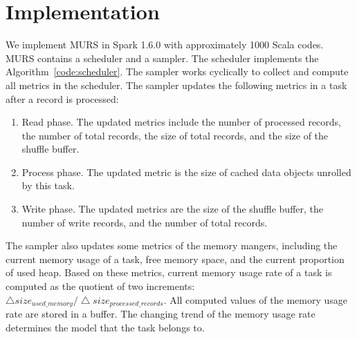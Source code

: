 \section{Implementation}

We implement MURS in Spark 1.6.0 with approximately 1000 Scala codes. MURS contains a scheduler and a sampler. The scheduler implements the Algorithm~\ref{code:scheduler}. 
The sampler works cyclically to collect and compute all metrics in the scheduler. 
The sampler updates the following metrics in a task after a record is processed:

\begin{enumerate}

\item Read phase. 
The updated metrics include the number of processed records, the number of total records, the size of total records, and the size of the shuffle buffer.

\item Process phase. 
The updated metric is the size of cached data objects unrolled by this task.

\item Write phase. 
The updated metrics are the size of the shuffle buffer, the number of write records, and the number of total records. 

\end{enumerate}

The sampler also updates some metrics of the memory mangers, including the current memory usage of a task, free memory space, and the current proportion of used heap. Based on these metrics, current memory usage rate of a task is computed as the quotient of two increments: $\bigtriangleup size_{used\_memory} / \bigtriangleup size_{processed\_records}$. All computed values of the memory usage rate are stored in a buffer. The changing trend of the memory usage rate determines the model that the task belongs to. 


